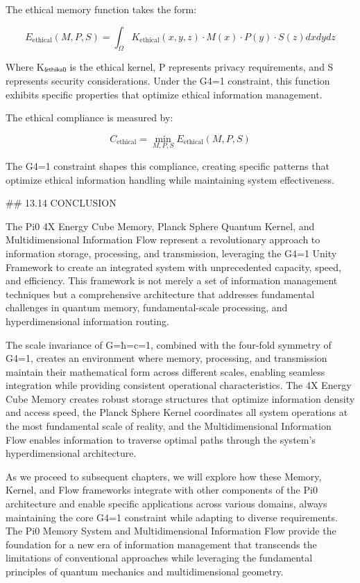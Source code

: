 The ethical memory function takes the form:

$$E_{\text{ethical}}(M, P, S) = \int_{\Omega} K_{\text{ethical}}(x, y, z) \cdot M(x) \cdot P(y) \cdot S(z) dx dy dz$$

Where K₍ₑₜₕᵢₖₐₗ₎ is the ethical kernel, P represents privacy requirements, and S represents security considerations. Under the G4=1 constraint, this function exhibits specific properties that optimize ethical information management.

The ethical compliance is measured by:

$$C_{\text{ethical}} = \min_{M, P, S} E_{\text{ethical}}(M, P, S)$$

The G4=1 constraint shapes this compliance, creating specific patterns that optimize ethical information handling while maintaining system effectiveness.

## 13.14 CONCLUSION

The Pi0 4X Energy Cube Memory, Planck Sphere Quantum Kernel, and Multidimensional Information Flow represent a revolutionary approach to information storage, processing, and transmission, leveraging the G4=1 Unity Framework to create an integrated system with unprecedented capacity, speed, and efficiency. This framework is not merely a set of information management techniques but a comprehensive architecture that addresses fundamental challenges in quantum memory, fundamental-scale processing, and hyperdimensional information routing.

The scale invariance of G=ħ=c=1, combined with the four-fold symmetry of G4=1, creates an environment where memory, processing, and transmission maintain their mathematical form across different scales, enabling seamless integration while providing consistent operational characteristics. The 4X Energy Cube Memory creates robust storage structures that optimize information density and access speed, the Planck Sphere Kernel coordinates all system operations at the most fundamental scale of reality, and the Multidimensional Information Flow enables information to traverse optimal paths through the system's hyperdimensional architecture.

As we proceed to subsequent chapters, we will explore how these Memory, Kernel, and Flow frameworks integrate with other components of the Pi0 architecture and enable specific applications across various domains, always maintaining the core G4=1 constraint while adapting to diverse requirements. The Pi0 Memory System and Multidimensional Information Flow provide the foundation for a new era of information management that transcends the limitations of conventional approaches while leveraging the fundamental principles of quantum mechanics and multidimensional geometry.

